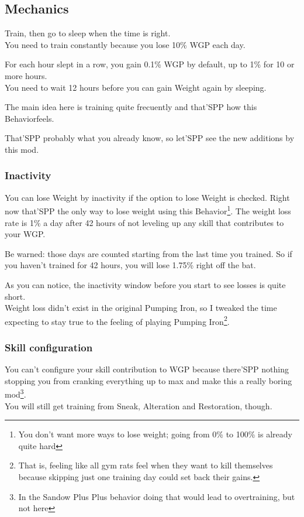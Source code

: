 \documentclass[11pt]{article}
\newcommand{\w}{Weight}
\newcommand{\W}{WGP}
\newcommand{\B}{Behavior}
\newcommand{\PI}{Pumping Iron}
\begin{document}
\subsection{Mechanics}
Train, then go to sleep when the time is right. \\
You need to train constantly because you lose 10\% \W{} each day.

For each hour slept in a row, you gain 0.1\% \W{} by default, up to 1\% for 10 or more hours.\\
You need to wait 12 hours before you can gain \w{} again by sleeping.

The main idea here is training quite frecuently and that'SPP how this \B feels.

That'SPP probably what you already know, so let'SPP see the new additions by this mod.

\subsubsection{Inactivity}
You can lose \w{} by inactivity if the option to lose \w{} is checked. Right now that'SPP the only way to lose weight using this \B\footnote{You don't want more ways to lose weight; going from 0\% to 100\% is already quite hard}.
The weight loss rate is 1\% a day after 42 hours of not leveling up any skill that contributes to your \W.

Be warned: those days are counted starting from the last time you trained. So if you haven't trained for 42 hours, you will lose 1.75\% right off the bat.

As you can notice, the inactivity window before you start to see losses is quite short.\\
Weight loss didn't exist in the original \PI, so I tweaked the time expecting to stay true to the feeling of playing \PI{}\footnote{That is, feeling like all gym rats feel when they want to kill themselves because skipping just one training day could set back their gains.}.

\subsubsection{Skill configuration}
You can't configure your skill contribution to \W{} because there'SPP nothing stopping you from cranking everything up to max and make this a really boring mod\footnote{In the Sandow Plus Plus behavior doing that would lead to overtraining, but not here}.\\
You will still get training from Sneak, Alteration and Restoration, though.
\end{document}
